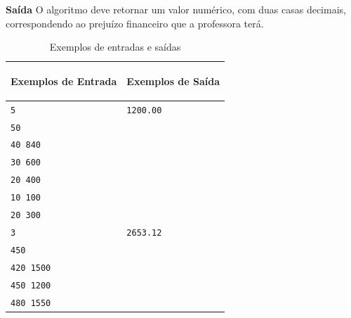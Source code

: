 {\vspace{0.3cm}
\textbf{Saída}
O algoritmo deve retornar um valor numérico, com duas casas decimais, correspondendo ao prejuízo financeiro que a professora terá.
\begin{table}[h]
    \centering
    \begin{tabular}{|p{8cm}|p{7cm}|}
        \hline
        \begin{center}
            \vspace{-0.3cm}
            \textbf{Exemplos de Entrada}
            \vspace{-0.3cm}
        \end{center} 
         &  
        \begin{center}
            \vspace{-0.3cm}
            \textbf{Exemplos de Saída}
            \vspace{-0.3cm}
        \end{center} \\ \hline
         \texttt{5} & \texttt{1200.00} \\  
         \texttt{50} & \texttt{} \\  
         \texttt{40 840} & \texttt{} \\
         \texttt{30 600} & \texttt{} \\
         \texttt{20 400} & \texttt{} \\
         \texttt{10 100} & \texttt{} \\
         \texttt{20 300} & \texttt{} \\
         \hline
                  \texttt{3} & \texttt{2653.12} \\  
         \texttt{450} & \texttt{} \\  
         \texttt{420 1500} & \texttt{} \\
         \texttt{450 1200} & \texttt{} \\
         \texttt{480 1550} & \texttt{} \\
\hline
    \end{tabular}
    \caption{Exemplos de entradas e saídas}
    \label{tab:inputProblem}
\end{table}}

\newpage

\begin{center}
\noindent

\end{center}